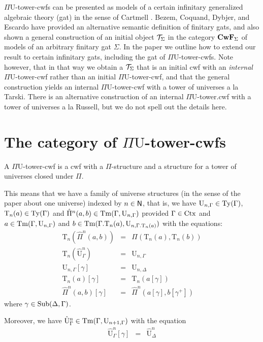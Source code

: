 \documentclass{lmcs}
\def\UU{\mathrm{U}}
\def\Ta{\mathrm{T}}
\def\Pihat{\hat{\Pi}}
\def\UUhat{\hat{\UU}}
\begin{document}
$\Pi\UU$-tower-cwfs can be presented as models of a certain infinitary generalized algebraic theory (gat) in the sense of Cartmell \cite{cartmell:phd}. Bezem, Coquand, Dybjer, and Escardo \cite{bezem:hofmann} have provided an alternative semantic definition of finitary gats, and also shown a general construction of an initial object ${\mathcal T}_\Sigma$ in the category $\textbf{CwF}_\Sigma$ of models of an arbitrary finitary gat $\Sigma$. In the paper we outline how to extend our result to certain infinitary gats, including the gat of $\Pi\UU$-tower-cwfs. Note however, that in that way we obtain a ${\mathcal T}_\Sigma$ that is an initial cwf with an {\em internal} $\Pi\UU$-tower-cwf rather than an initial $\Pi\UU$-tower-cwf, and that the general construction yields an internal $\Pi\UU$-tower-cwf with a tower of universes a la Tarski. There is an alternative construction of an internal $\Pi\UU$-tower.cwf with a tower of universes a la Russell, but we do not spell out the details here.

\section{The category of $\Pi\UU$-tower-cwfs}

 A $\Pi \UU$-tower-cwf is a cwf with a $\Pi$-structure and a structure for a tower of universes closed under $\Pi$.
 
This means that we have a family of universe structures (in the sense of the paper about one universe) indexed by $n \in \mathsf{N}$, that is, we have $\UU_{n,\Gamma} \in \Ty(\Gamma)$, $\Ta_n(a) \in \Ty(\Gamma)$ and $\Pihat^n(a,b) \in \Tm(\Gamma,\UU_{n,\Gamma})$ provided $\Gamma \in \mathrm{Ctx}$ and $a  \in \Tm(\Gamma,\UU_{n,\Gamma})$ and 
$b \in \Tm(\Gamma . \Ta_n(a),\UU_{n,\Gamma . \Ta_n(a)})$ with the equations:
\begin{eqnarray*}
\Ta_n(\Pihat^n(a,b)) &= &\Pi(\Ta_n(a),\Ta_n(b))\\
\Ta_n(\UUhat^n_{\Gamma}) &= &\UU_{n,\Gamma}\\
\UU_{n,\Gamma}[\gamma] &=& \UU_{n,\Delta}\\
\Ta_n(a)[\gamma] &=& \Ta_n(a[\gamma])\\
\Pihat^n(a,b)[\gamma] &=& \Pihat^n(a[\gamma],b[\gamma^+])
\end{eqnarray*}
where $\gamma \in \mathrm{Sub}(\Delta,\Gamma)$.

Moreover, we have $\UUhat^n_{\Gamma} \in \Tm(\Gamma,\UU_{n+1,\Gamma})$ with the equation
\begin{eqnarray*}
\UUhat^n_\Gamma[\gamma] &=& \UUhat^n_\Delta
\end{eqnarray*}
\end{document}

